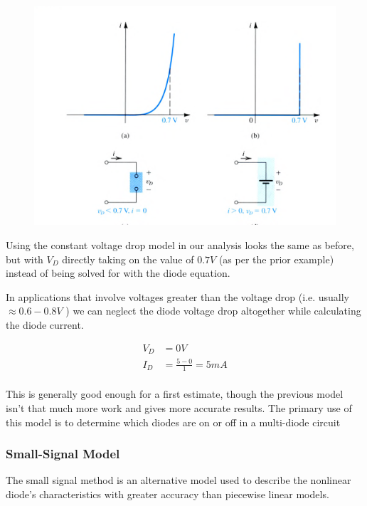 \documentclass[10pt]{article}
\begin{document}
\begin{figure}[H]
	\centering
	\includegraphics[width=0.8\linewidth]{img/image_2022-09-16-22-49-19.png}
\end{figure}


Using the constant voltage drop model in our analysis looks the same as before, but with $ V_D $ directly taking on the value of $ 0.7V $ (as per the prior example) instead of being solved for with the diode equation.



In applications that involve voltages greater than the voltage drop (i.e. usually $ \approx 0.6-0.8V $  ) we can neglect the diode voltage drop altogether while calculating the diode current.

\begin{equation}
	\begin{split}
		V_D &= 0V \\
		 I_D &= \frac{5-0}{1} = 5mA  \\
	\end{split}
	\label{eq:}
\end{equation}



This is generally good enough for a first estimate, though the previous model isn't that much more work and gives more accurate results.
The primary use of this model is to determine which diodes are on or off in a multi-diode circuit


\subsubsection{Small-Signal Model}


The small signal method is an alternative model used to describe the nonlinear diode's characteristics with greater accuracy than piecewise linear models.
\end{document}
